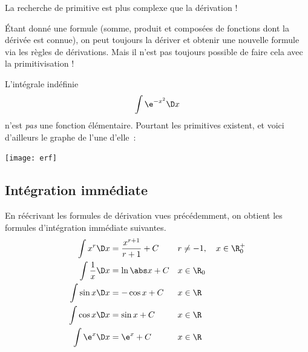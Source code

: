 
\begin{frame}
  \begin{remark*}
    La recherche de primitive est plus complexe que la dérivation !\pause{}

    Étant donné une \og formule\fg{} (somme, produit et composées de fonctions dont la dérivée est connue), on peut toujours la dériver et obtenir une nouvelle \og formule\fg{} via les règles de dérivations. Mais il n'est pas toujours possible de faire cela avec la primitivisation !
  \end{remark*}

  \begin{example}
    L'intégrale indéfinie
    \begin{equation*}
      \int \e^{-x^2} \D x
    \end{equation*}\pause{}
    n'est \emph{pas} une fonction élémentaire.\pause{} Pourtant les primitives existent\pause{}, et voici d'ailleurs le graphe de l'une d'elle~:
    \begin{center}
      \texttt{[image: erf]}
    \end{center}
  \end{example}
\end{frame}
\subsection{Intégration immédiate}
\begin{frame}
  En réécrivant les formules de dérivation vues précédemment, on obtient les formules d'intégration immédiate suivantes.\pause{}
  \begin{align*}
    \int x^r \D x        & = \frac{x^{r+1}}{r+1}+C &  & r \neq -1, \quad x \in \R_0^+ \\
    \int \frac{1}{x}\D x & = \ln \abs x + C        &  & x \in \R_0                    \\
    \int \sin x \D x     & = -\cos x + C           &  & x \in \R                      \\
    \int \cos x \D x     & = \sin x + C            &  & x \in \R                      \\
    \int \e^x \D x       & = \e^x + C              &  & x \in \R                      \\
  \end{align*}
\end{frame}


